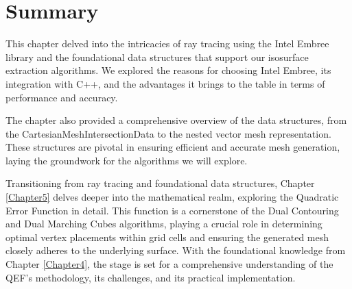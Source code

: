 \section{Summary}
This chapter delved into the intricacies of ray tracing using the Intel Embree library and the foundational data structures that support our isosurface extraction algorithms. We explored the reasons for choosing Intel Embree, its integration with C++, and the advantages it brings to the table in terms of performance and accuracy.

The chapter also provided a comprehensive overview of the data structures, from the CartesianMeshIntersectionData to the nested vector mesh representation. These structures are pivotal in ensuring efficient and accurate mesh generation, laying the groundwork for the algorithms we will explore.

Transitioning from ray tracing and foundational data structures, Chapter \ref{Chapter5} delves deeper into the mathematical realm, exploring the Quadratic Error Function in detail. This function is a cornerstone of the Dual Contouring and Dual Marching Cubes algorithms, playing a crucial role in determining optimal vertex placements within grid cells and ensuring the generated mesh closely adheres to the underlying surface. With the foundational knowledge from Chapter \ref{Chapter4}, the stage is set for a comprehensive understanding of the QEF's methodology, its challenges, and its practical implementation.